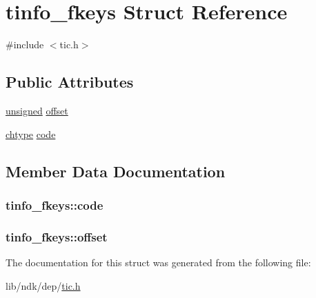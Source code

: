 \hypertarget{structtinfo__fkeys}{\section{tinfo\-\_\-fkeys Struct Reference}
\label{structtinfo__fkeys}
}


{\ttfamily \#include $<$tic.\-h$>$}

\subsection*{Public Attributes}
\begin{DoxyCompactItemize}
\item 
\hyperlink{curses_8priv_8h_aca40206900cfc164654362fa8d4ad1e6}{unsigned} \hyperlink{structtinfo__fkeys_a0df395fe4aa272262c85852b8afc52ad}{offset}
\item 
\hyperlink{curses_8priv_8h_ad21482314c581139d01159829e841e51}{chtype} \hyperlink{structtinfo__fkeys_a4ee96a6b4695c15401351a42f4009590}{code}
\end{DoxyCompactItemize}


\subsection{Member Data Documentation}
\hypertarget{structtinfo__fkeys_a4ee96a6b4695c15401351a42f4009590}{
\subsubsection[{code}]{ tinfo\-\_\-fkeys\-::code}}\label{structtinfo__fkeys_a4ee96a6b4695c15401351a42f4009590}
\hypertarget{structtinfo__fkeys_a0df395fe4aa272262c85852b8afc52ad}{
\subsubsection[{offset}]{ tinfo\-\_\-fkeys\-::offset}}\label{structtinfo__fkeys_a0df395fe4aa272262c85852b8afc52ad}


The documentation for this struct was generated from the following file\-:\begin{DoxyCompactItemize}
\item 
lib/ndk/dep/\hyperlink{tic_8h}{tic.\-h}\end{DoxyCompactItemize}
